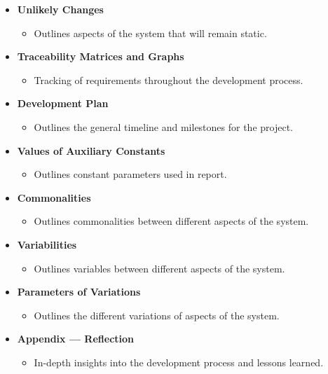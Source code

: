 \begin{itemize}
    \item \textbf{Unlikely Changes} 
    \begin{itemize}
        \item Outlines aspects of the system that will remain static.
    \end{itemize}
    
    \item \textbf{Traceability Matrices and Graphs} 
    \begin{itemize}
        \item Tracking of requirements throughout the development process.
    \end{itemize}
    
    \item \textbf{Development Plan} 
    \begin{itemize}
        \item Outlines the general timeline and milestones for the project.
    \end{itemize}
    
    \item \textbf{Values of Auxiliary Constants} 
    \begin{itemize}
        \item Outlines constant parameters used in report.
    \end{itemize}
    
    \item \textbf{Commonalities} 
    \begin{itemize}
        \item Outlines commonalities between different aspects of the system.
    \end{itemize}
    
    \item \textbf{Variabilities} 
    \begin{itemize}
        \item Outlines variables between different aspects of the system.
    \end{itemize}
    
    \item \textbf{Parameters of Variations} 
    \begin{itemize}
        \item Outlines the different variations of aspects of the system.
    \end{itemize}
    
    \item \textbf{Appendix — Reflection} 
    \begin{itemize}
        \item In-depth insights into the development process and lessons learned.
    \end{itemize}
\end{itemize}



